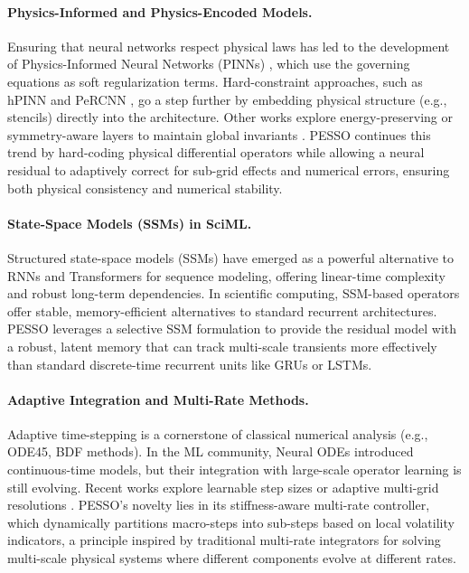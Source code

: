 \documentclass{article}
\theoremstyle{plain}
\theoremstyle{definition}
\theoremstyle{remark}
\begin{document}
\paragraph{Physics-Informed and Physics-Encoded Models.}
Ensuring that neural networks respect physical laws has led to the development of Physics-Informed Neural Networks (PINNs) \cite{raissi2019pinn}, which use the governing equations as soft regularization terms. Hard-constraint approaches, such as hPINN \cite{lu2021hPINN} and PeRCNN \cite{rao2021percenn}, go a step further by embedding physical structure (e.g., stencils) directly into the architecture. Other works explore energy-preserving or symmetry-aware layers to maintain global invariants \cite{yu2024dynSysIntro}. PESSO continues this trend by hard-coding physical differential operators while allowing a neural residual to adaptively correct for sub-grid effects and numerical errors, ensuring both physical consistency and numerical stability.

\paragraph{State-Space Models (SSMs) in SciML.}
Structured state-space models (SSMs) \cite{gu2021hippo, gu2023mamba} have emerged as a powerful alternative to RNNs and Transformers for sequence modeling, offering linear-time complexity and robust long-term dependencies. In scientific computing, SSM-based operators \cite{hu2024ssmNeuralOperator} offer stable, memory-efficient alternatives to standard recurrent architectures. PESSO leverages a selective SSM formulation to provide the residual model with a robust, latent memory that can track multi-scale transients more effectively than standard discrete-time recurrent units like GRUs or LSTMs.

\paragraph{Adaptive Integration and Multi-Rate Methods.}
Adaptive time-stepping is a cornerstone of classical numerical analysis (e.g., ODE45, BDF methods). In the ML community, Neural ODEs \cite{chen2018neuralode} introduced continuous-time models, but their integration with large-scale operator learning is still evolving. Recent works explore learnable step sizes or adaptive multi-grid resolutions \cite{wang2025pecan, ren2025mtsPercnn}. PESSO's novelty lies in its stiffness-aware multi-rate controller, which dynamically partitions macro-steps into sub-steps based on local volatility indicators, a principle inspired by traditional multi-rate integrators for solving multi-scale physical systems where different components evolve at different rates.
\end{document}
